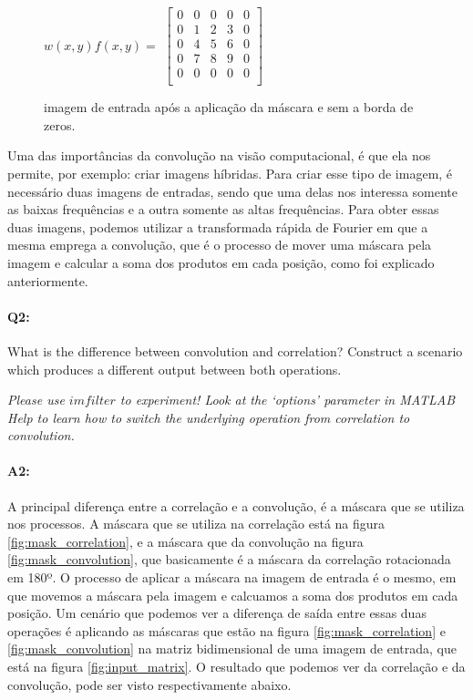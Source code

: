 \begin{figure}[!htb]
	\centering
	$ w(x, y) f(x, y) = $
	$
	\begin{bmatrix}
	    0 & 0 & 0 & 0 & 0 \\
	    0 & 1 & 2 & 3 & 0 \\
	    0 & 4 & 5 & 6 & 0 \\
	    0 & 7 & 8 & 9 & 0 \\
	    0 & 0 & 0 & 0 & 0 \\
	\end{bmatrix}
	$
	\caption{imagem de entrada após a aplicação da máscara e sem a borda de zeros.}
\end{figure}

Uma das importâncias da convolução na visão computacional, é que ela nos permite, por exemplo: criar imagens híbridas. Para criar esse tipo de imagem, é necessário duas imagens de entradas, sendo que uma delas nos interessa somente as baixas frequências e a outra somente as altas frequências. Para obter essas duas imagens, podemos utilizar a transformada rápida de Fourier em que a mesma emprega a convolução, que é o processo de mover uma máscara pela imagem e calcular a soma dos produtos em cada posição, como foi explicado anteriormente.


\pagebreak
\paragraph{Q2:} What is the difference between convolution and correlation? Construct a scenario which produces a different output between both operations.

\emph{Please use \href{https://www.mathworks.com/help/images/ref/imfilter.html}{$imfilter$} to experiment! Look at the `options' parameter in MATLAB Help to learn how to switch the underlying operation from correlation to convolution.}

\paragraph{A2:} A principal diferença entre a correlação e a convolução, é a máscara que se utiliza nos processos. A máscara que se utiliza na correlação está na figura \ref{fig:mask_correlation}, e a máscara que da convolução na figura \ref{fig:mask_convolution}, que basicamente é a máscara da correlação rotacionada em 180º. O processo de aplicar a máscara na imagem de entrada é o mesmo, em que movemos a máscara pela imagem e calcuamos a soma dos produtos em cada posição. Um cenário que podemos ver a diferença de saída entre essas duas operações é aplicando as máscaras que estão na figura \ref{fig:mask_correlation} e \ref{fig:mask_convolution} na matriz bidimensional de uma imagem de entrada, que está na figura \ref{fig:input_matrix}. O resultado que podemos ver da correlação e da convolução, pode ser visto respectivamente abaixo.

